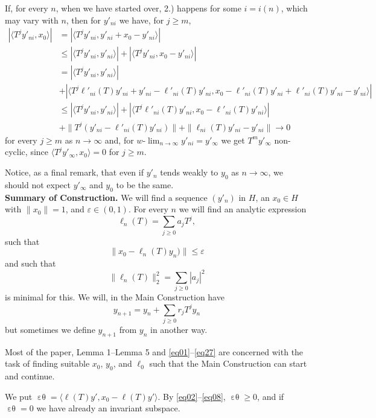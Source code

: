 \documentclass[12pt,oneside,reqno]{amsart}
\theoremstyle{definition}
\DeclareMathOperator*{\VE}{\varepsilon\theta}
\begin{document}
If, for every $n$, when we have started over, 2.) happens for some $i = i(n)$, which may vary with $n$, then for $y'_{n i}$ we have, for $j \ge m$,
\begin{align*}
|\langle T^j y'_{n i}, x_0\rangle| & = | \langle T^j y'_{n i}, y'_{n i} + x_0 - y'_{n i}\rangle | \\
& \le | \langle T^{j} y'_{n i} , y'_{n i}\rangle| + |\langle T^j y'_{n i} , x_0 - y'_{n i} \rangle |\\
& =  | \langle T^{j} y'_{n i} , y'_{n i}\rangle| \\
& + |\langle T^j \ell'_{n i}(T) y'_{n i} + y'_{n i} - \ell'_{n i}(T) y'_{n i}, x_0 - \ell'_{n i}(T) y'_{n i} + \ell'_{n i}(T) y'_{n i} - y'_{n i}  \rangle|\\
& \le |\langle T^j y'_{n i}, y'_{n i}\rangle| + |\langle T^j \ell'_{n i}(T) y'_{n i}, x_0 - \ell'_{n i} (T) y'_{n i}  \rangle|\\ 
& +  \|T^j (y'_{n i} - \ell'_{n i} (T) y'_{n i})\| + \|\ell_{n i} (T) y'_{n i} - y'_{n i}\| \longrightarrow 0
\end{align*}
for every $j \ge m$ as $n \rightarrow \infty$ and, for $w$-$\displaystyle\lim_{n \rightarrow \infty} y'_{n i} = y'_\infty$ we get $T^m y'_\infty$ non-cyclic, since $\langle T^j y'_\infty, x_0\rangle = 0$ for $j \ge m$.
\bigskip

Notice, as a final remark, that even if $y'_n$ tends weakly to $y_0$ as $n \rightarrow \infty$, we should not expect $y'_\infty $ and $y_0$ to be the same.\\


\noindent \textbf{Summary of Construction.}   We will find a sequence $(y'_n)$ in $H$, an $x_0 \in H$ with $\|x_0\| =1$, and $\varepsilon \in (0,1)$. For every  $n$ we will find an analytic expression
$$\ell_n (T) = \sum_{j \ge 0} a_j T^j,$$
such that 
$$\|x_0 - \ell_n (T) y_n)\| \le \varepsilon$$
and such that 
$$\| \ell_n(T) \|_2^2 = \sum_{j\ge 0} |a_j|^2$$
is minimal for this. We will, in the Main Construction have
$$y_{n+1} = y_n + \sum_{j \ge 0} r_j T^j y_n$$
but sometimes we define $y_{n+1}$ from $y_n$ in another way.

Most of the paper, Lemma 1--Lemma 5 and \eqref{eq01}--\eqref{eq27} are concerned with the task of finding suitable $x_0$, $y_0$, and $\ell_0$ such that the Main Construction can start and continue.

We put $\displaystyle \VE = \langle \ell(T) y', x_0 - \ell (T) y' \rangle$. By \eqref{eq02}--\eqref{eq08}, $\VE \ge 0$, and if $\VE =0$ we have already an invariant subspace.
\end{document}
